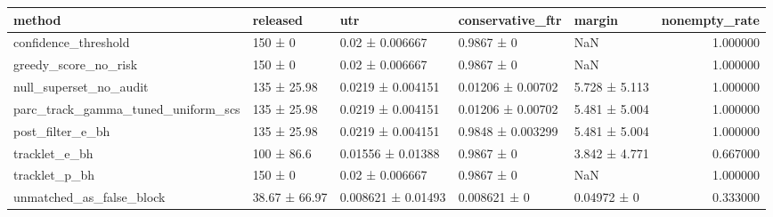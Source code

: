 \begin{tabular}{lllllr}
\toprule
method & released & utr & conservative_ftr & margin & nonempty_rate \\
\midrule
confidence_threshold & 150 ± 0 & 0.02 ± 0.006667 & 0.9867 ± 0 & NaN & 1.000000 \\
greedy_score_no_risk & 150 ± 0 & 0.02 ± 0.006667 & 0.9867 ± 0 & NaN & 1.000000 \\
null_superset_no_audit & 135 ± 25.98 & 0.0219 ± 0.004151 & 0.01206 ± 0.00702 & 5.728 ± 5.113 & 1.000000 \\
parc_track_gamma_tuned_uniform_scs & 135 ± 25.98 & 0.0219 ± 0.004151 & 0.01206 ± 0.00702 & 5.481 ± 5.004 & 1.000000 \\
post_filter_e_bh & 135 ± 25.98 & 0.0219 ± 0.004151 & 0.9848 ± 0.003299 & 5.481 ± 5.004 & 1.000000 \\
tracklet_e_bh & 100 ± 86.6 & 0.01556 ± 0.01388 & 0.9867 ± 0 & 3.842 ± 4.771 & 0.667000 \\
tracklet_p_bh & 150 ± 0 & 0.02 ± 0.006667 & 0.9867 ± 0 & NaN & 1.000000 \\
unmatched_as_false_block & 38.67 ± 66.97 & 0.008621 ± 0.01493 & 0.008621 ± 0 & 0.04972 ± 0 & 0.333000 \\
\bottomrule
\end{tabular}
